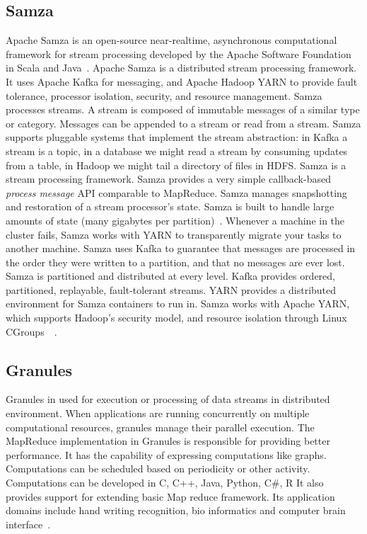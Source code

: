      \pv


     
\subsection{Samza}

Apache Samza is an open-source near-realtime, asynchronous
computational framework for stream processing developed by the Apache
Software Foundation in Scala and Java~\cite{www-samza-3}.  Apache
Samza is a distributed stream processing framework. It uses Apache
Kafka for messaging, and Apache Hadoop YARN to provide fault
tolerance, processor isolation, security, and resource
management. Samza processes streams. A stream is composed of immutable
messages of a similar type or category. Messages can be appended to a
stream or read from a stream.  Samza supports pluggable systems that
implement the stream abstraction: in Kafka a stream is a topic, in a
database we might read a stream by consuming updates from a table, in
Hadoop we might tail a directory of files in HDFS. Samza is a stream
processing framework. Samza provides a very simple callback-based
\textit{process message} API comparable to MapReduce.  Samza manages
snapshotting and restoration of a stream processor’s state.  Samza is
built to handle large amounts of state (many gigabytes per
partition)~\cite{www-samza-1}.  Whenever a machine in the cluster
fails, Samza works with YARN to transparently migrate your tasks to
another machine. Samza uses Kafka to guarantee that messages are
processed in the order they were written to a partition, and that no
messages are ever lost.  Samza is partitioned and distributed at every
level. Kafka provides ordered, partitioned, replayable, fault-tolerant
streams. YARN provides a distributed environment for Samza containers
to run in. Samza works with Apache YARN, which supports Hadoop’s
security model, and resource isolation through Linux
CGroups~\cite{www-samza-4}~\cite{www-samza-3}.

\subsection{Granules}

Granules in used for execution or processing of data streams in
distributed environment.  When applications are running concurrently
on multiple computational resources, granules manage their parallel
execution.  The MapReduce implementation in Granules is responsible
for providing better performance. It has the capability of expressing
computations like graphs.  Computations can be scheduled based on
periodicity or other activity.  Computations can be developed in C,
C++, Java, Python, C\#, R It also provides support for extending basic
Map reduce framework.  Its application domains include hand writing
recognition, bio informatics and computer brain
interface~\cite{www-granules}.

